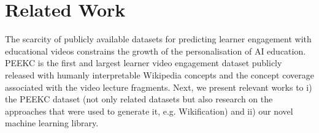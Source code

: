 \documentclass[letterpaper]{article} %
\begin{document}



\section{Related Work}

The scarcity of publicly available datasets 
for predicting learner engagement with educational videos constrains the growth of the personalisation of AI education. PEEKC is the first and largest learner video engagement dataset publicly released with humanly interpretable Wikipedia concepts and the concept coverage associated with the video lecture fragments. 
Next, we present relevant works to i) the PEEKC dataset (not only related datasets but also research on the approaches that were used to generate it, e.g. Wikification) and ii) our novel machine learning library. 
\end{document}
